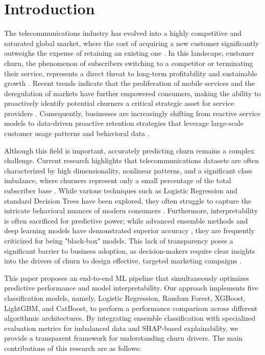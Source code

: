 \documentclass[a4paper,twoside]{article}
\begin{document}
\newpage

\section{Introduction}

The telecommunications industry has evolved into a highly competitive and saturated global market, where the cost of acquiring a new customer significantly outweighs the expense of retaining an existing one \cite{Manzoor2024}. In this landscape, customer churn, the phenomenon of subscribers switching to a competitor or terminating their service, represents a direct threat to long-term profitability and sustainable growth \cite{Jain2021}. Recent trends indicate that the proliferation of mobile services and the deregulation of markets have further empowered consumers, making the ability to proactively identify potential churners a critical strategic asset for service providers \cite{Amin2023}. Consequently, businesses are increasingly shifting from reactive service models to data-driven proactive retention strategies that leverage large-scale customer usage patterns and behavioral data \cite{Ahmad2019}.

Although this field is important, accurately predicting churn remains a complex challenge. Current research highlights that telecommunications datasets are often characterized by high dimensionality, nonlinear patterns, and a significant class imbalance, where churners represent only a small percentage of the total subscriber base \cite{Haddadi2024}. While various techniques such as Logistic Regression and standard Decision Trees have been explored, they often struggle to capture the intricate behavioral nuances of modern consumers \cite{Jain2020}. Furthermore, interpretability is often sacrificed for predictive power; while advanced ensemble methods and deep learning models have demonstrated superior accuracy \cite{Saha2024}, they are frequently criticized for being "black-box" models. This lack of transparency poses a significant barrier to business adoption, as decision-makers require clear insights into the drivers of churn to design effective, targeted marketing campaigns \cite{DeBock2021}.

This paper proposes an end-to-end ML pipeline that simultaneously optimizes predictive performance and model interpretability. Our approach implements five classification models, namely, Logistic Regression, Random Forest, XGBoost, LightGBM, and CatBoost, to perform a performance comparison across different algorithmic architectures. By integrating ensemble classification with specialized evaluation metrics for imbalanced data and SHAP-based explainability, we provide a transparent framework for understanding churn drivers. The main contributions of this research are as follows:
\end{document}
